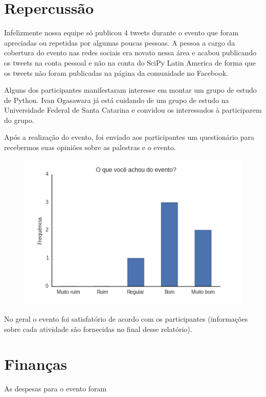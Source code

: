 \documentclass[12pt]{article}
\begin{document}
\section*{Repercussão}

Infelizmente nossa equipe só publicou 4 tweets durante o evento que foram
apreciadas ou repetidas por algumas poucas pessoas.
A pessoa a cargo da cobertura do evento nas redes sociais era novato nessa área
e acabou publicando os tweets na conta pessoal e não na conta do SciPy Latin
America de forma que os tweets não foram publicadas na página da comunidade no
Facebook.

Alguns dos participantes manifestaram interesse em montar um grupo de estudo de Python. Ivan
Ogasawara já está cuidando de um grupo de estudo na Universidade Federal de Santa Catarina e
convidou os interessados à participarem do grupo.

Após a realização do evento, foi enviado aos participantes um questionário para recebermos suas
opiniões sobre as palestras e o evento.

\begin{figure}[!h]
    \centering
    \includegraphics[height=0.25\textheight]{images/evento1.png}
\end{figure}

No geral o evento foi satisfatório de acordo com os participantes
(informações sobre cada atividade são fornecidas no final desse relatório).

\newpage

\section*{Finanças}

As despesas para o evento foram
\end{document}
